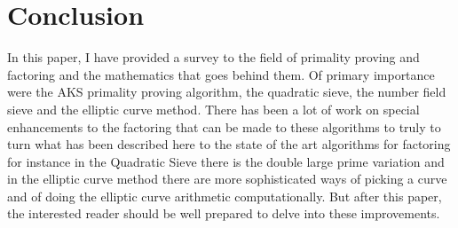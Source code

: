 \documentclass{article}
\begin{document}
\section{Conclusion}
In this paper, I have provided a survey to the field of primality proving and factoring and the mathematics that goes behind them. Of primary importance were the AKS primality proving algorithm, the quadratic sieve, the number field sieve and the elliptic curve method. There has been a lot of work on special enhancements to the factoring that can be made to these algorithms to truly to turn what has been described here to the state of the art algorithms for factoring for instance in the Quadratic Sieve there is the double large prime variation and in the elliptic curve method there are more sophisticated ways of picking a curve and of doing the elliptic curve arithmetic computationally. But after this paper, the interested reader should be well prepared to delve into these improvements. 


\end{document}
